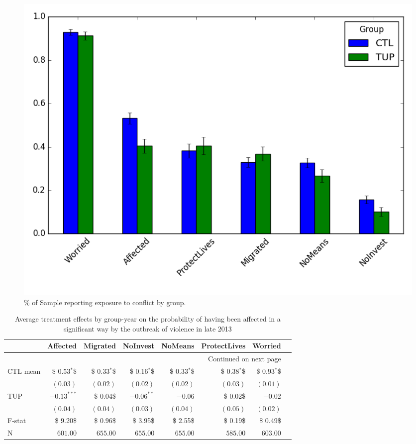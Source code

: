 \documentclass[12pt,article]{article}
\begin{document}
\begin{figure}[htb]
\centering
\includegraphics[width=.9\linewidth]{../figures/conflict_exposure.png}
\caption{\label{fig:conflict_exposure}\% of Sample reporting exposure to conflict by group.}
\end{figure} 

\begin{longtable}{lrrrrrrr}
\caption{\label{tab:Income}Average treatment effects by group-year on the probability of having been affected in a significant way by the outbreak of violence in late 2013}
\\
\hline
 & Affected & Migrated & NoInvest & NoMeans & ProtectLives & Worried\\
\hline
\endhead
\hline\multicolumn{7}{r}{Continued on next page} \\
\endfoot
\endlastfoot
CTL mean & \$ 0.53$^{\textbf{*}}$\$ & \$ 0.33$^{\textbf{*}}$\$ & \$ 0.16$^{\textbf{*}}$\$ & \$ 0.33$^{\textbf{*}}$\$ & \$ 0.38$^{\textbf{*}}$\$ & \$ 0.93$^{\textbf{*}}$\$\\
 & $( 0.03)$ & $( 0.02)$ & $( 0.02)$ & $( 0.02)$ & $( 0.03)$ & $( 0.01)$\\
TUP & $-0.13^{***}$ & \$ 0.04\$ & $-0.06^{**}$ & $-0.06$ & \$ 0.02\$ & $-0.02$\\
 & $( 0.04)$ & $( 0.04)$ & $( 0.03)$ & $( 0.04)$ & $( 0.05)$ & $( 0.02)$\\
\hline
F-stat & \$ 9.20\$ & \$ 0.96\$ & \$ 3.95\$ & \$ 2.55\$ & \$ 0.19\$ & \$ 0.49\$\\
N & $601.00$ & $655.00$ & $655.00$ & $655.00$ & $585.00$ & $603.00$\\
\hline
\end{longtable}
\end{document}
